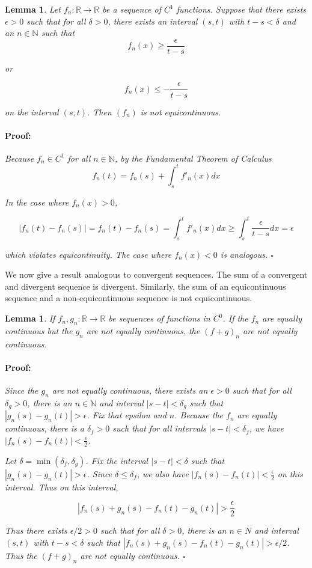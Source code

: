\documentclass{article}
\newenvironment{proof}{\paragraph{Proof:}}{\hfill$\square$}
\newtheorem{lemma}[theorem]{Lemma}
\newcommand{\R}{\mathbb{R}}
\newcommand{\N}{\mathbb{N}}
\begin{document}
\begin{lemma}
Let $f_n: \R \rightarrow \R$ be a sequence of $C^1$ functions. Suppose that there exists $\epsilon > 0$ such that for all $\delta > 0$, there exists an interval $(s, t)$ with $t-s < \delta$ and an $n \in \N$ such that
\[
f_n(x) \geq \frac{\epsilon}{t-s}
\]

or

\[
f_n(x) \leq -\frac{\epsilon}{t-s}
\]

on the interval $(s, t)$. Then $(f_n)$ is not equicontinuous.
\begin{proof}
Because $f_n \in C^1$ for all $n \in \N$, by the Fundamental Theorem of Calculus
\[
f_n(t) = f_n(s) + \int_s^t f'_n(x)dx
\]

In the case where $f_n(x) > 0$,

\[
|f_n(t) - f_n(s)| =  f_n(t) - f_n(s) = \int_s^t f'_n(x)dx \geq \int_s^t \frac{\epsilon}{t-s} dx = \epsilon
\]

which violates equicontinuity. The case where $f_n(x) < 0$ is analogous.
\end{proof}
\end{lemma}

We now give a result analogous to convergent sequences. The sum of a convergent and divergent sequence is divergent. Similarly, the sum of an equicontinuous sequence and a non-equicontinuous sequence is not equicontinuous.

\begin{lemma}
If $f_n, g_n: \R \rightarrow \R$ be sequences of functions in $C^0$. If the $f_n$ are equally continuous but the $g_n$ are not equally continuous, the $(f+g)_n$ are not equally continuous.
\begin{proof}
Since the $g_n$ are not equally continuous, there exists an $\epsilon > 0$ such that for all $\delta_g>0$, there is an $n \in \N$ and interval $|s-t| < \delta_g$ such that $|g_n(s) - g_n(t)| > \epsilon$. Fix that epsilon and $n$. Because the $f_n$ are equally continuous, there is a $\delta_f > 0$ such that for all intervals $|s-t| < \delta_f$, we have $|f_n(s) - f_n(t)| < \frac{\epsilon}{2}$. 

Let $\delta = \min(\delta_f, \delta_g)$. Fix the interval $|s-t| < \delta$ such that $|g_n(s) - g_n(t)| > \epsilon$. Since $\delta \leq \delta_f$, we also have $|f_n(s) - f_n(t)| < \frac{\epsilon}{2}$ on this interval. Thus on this interval,

\[
|f_n(s) + g_n(s)- f_n(t) - g_n(t)| > \frac{\epsilon}{2}
\]

Thus there exists $\epsilon/2 > 0$ such that for all $\delta > 0$, there is an $n \in N$ and interval $(s, t)$ with $t-s < \delta$ such that $|f_n(s) + g_n(s) - f_n(t) - g_n(t)| > \epsilon/2$. Thus the $(f+g)_n$ are not equally continuous.
\end{proof}
\end{lemma}
\end{document}

